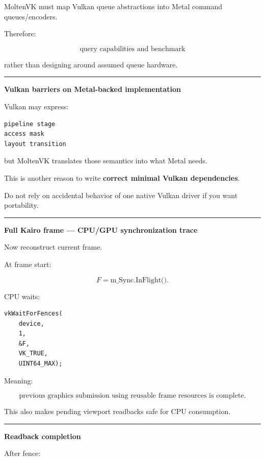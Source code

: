 MoltenVK must map Vulkan queue abstractions into Metal command queues/encoders.

Therefore:

\[
\boxed{
\text{query capabilities and benchmark}
}
\]

rather than designing around assumed queue hardware.

\begin{center}\rule{0.5\linewidth}{0.5pt}\end{center}

\textbf{Vulkan barriers on Metal-backed implementation}

Vulkan may express:

\begin{verbatim}
pipeline stage
access mask
layout transition
\end{verbatim}

but MoltenVK translates those semantics into what Metal needs.

This is another reason to write \textbf{correct minimal Vulkan dependencies}.

Do not rely on accidental behavior of one native Vulkan driver if you want portability.

\begin{center}\rule{0.5\linewidth}{0.5pt}\end{center}

\textbf{Full Kairo frame --- CPU/GPU synchronization trace}

Now reconstruct current frame.

At frame start:

\[
F=\text{m\_Sync.InFlight()}.
\]

CPU waits:

\begin{verbatim}
vkWaitForFences(
    device,
    1,
    &F,
    VK_TRUE,
    UINT64_MAX);
\end{verbatim}

Meaning:

\[
\boxed{
\text{previous graphics submission using reusable frame resources is complete}.
}
\]

This also makes pending viewport readbacks safe for CPU consumption.

\begin{center}\rule{0.5\linewidth}{0.5pt}\end{center}

\textbf{Readback completion}

After fence:

